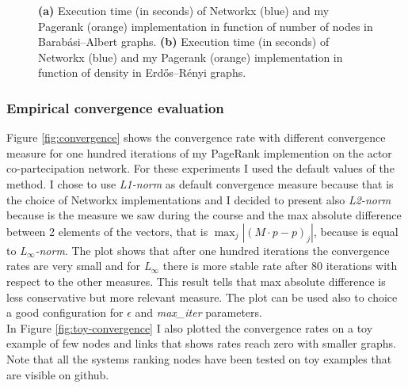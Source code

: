 \documentclass{article}
\begin{document}
\begin{figure}
\begin{subfigure}{0.45\textwidth}
         \subcaption[]{}
         \label{fig:times_for_density}
     \end{subfigure}
     \hfill
    \caption{\textbf{(a)} Execution time (in seconds) of Networkx (blue) and my Pagerank (orange) implementation in function of number of nodes in Barabási–Albert graphs. \textbf{(b)} Execution time (in seconds) of Networkx (blue) and my Pagerank (orange) implementation in function of density in Erdős–Rényi graphs.}
    \label{fig:performance}
\end{figure}

\subsubsection{Empirical convergence evaluation}
Figure \ref{fig:convergence} shows the convergence rate with different convergence measure for one hundred iterations of my PageRank implemention on the actor co-partecipation network. For these experiments I used the default values of the method. 
I chose to use \textit{L1-norm} as default convergence measure because that is the choice of Networkx implementations and I decided to present also \textit{L2-norm} because is the measure we saw during the course and the max absolute difference between 2 elements of the vectors, that is $\max_{j} |(M\cdot p - p)_{j}|$, because is equal to \textit{L$_{\infty}$-norm}. The plot shows that after one hundred iterations the convergence rates are very small and for \textit{L$_{\infty}$} there is more stable rate after 80 iterations with respect to the other measures. This result tells that max absolute difference is less conservative but more relevant measure. The plot can be used also to choice a good configuration for $\epsilon$ and \textit{max\_iter} parameters. \\ In Figure \ref{fig:toy-convergence} I also plotted the convergence rates on a toy example of few nodes and links that shows rates reach zero with smaller graphs. Note that all the systems ranking nodes have been tested on toy examples that are visible on github.
\end{document}

